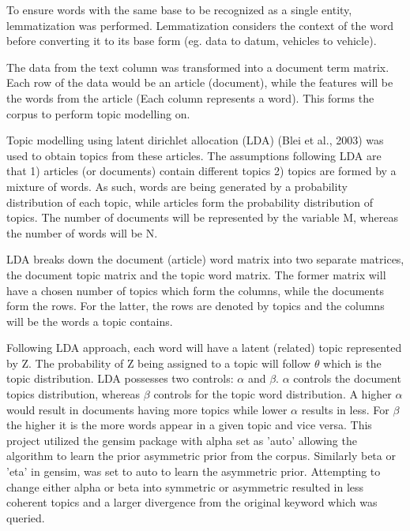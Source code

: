\documentclass{article}
\begin{document}
\begin{titlepage}
\begin{itemize}
			\quad To ensure words with the same base to be recognized as a single entity, lemmatization was performed. Lemmatization considers the context of the word before converting it to its base form (eg. data to datum, vehicles to vehicle). 
            
             \quad The data from the text column was transformed into a document term matrix. Each row of the data would be an article (document), while the features will be the words from the article (Each column represents a word). This forms the corpus to perform topic modelling on.
            
            \quad Topic modelling using latent dirichlet allocation (LDA) (Blei et al., 2003) was used to obtain topics from these articles. The assumptions following LDA are that 1) articles (or documents) contain different topics 2) topics are formed by a mixture of words. As such, words are being generated by a probability distribution of each topic, while articles form the probability distribution of topics. The number of documents will be represented by the variable M, whereas the number of words will be N.
            
           	\quad LDA breaks down the document (article) word matrix into two separate matrices, the document topic matrix and the topic word matrix. The former matrix will have a chosen number of topics which form the columns, while the documents form the rows. For the latter, the rows are denoted by topics and the columns will be the words a topic contains.
            
            \quad Following LDA approach, each word will have a latent (related) topic represented by Z. The probability of Z being assigned to a topic will follow $\theta$ which is the topic distribution. LDA possesses two controls: $\alpha$ and $\beta$. $\alpha$ controls the document topics distribution, whereas $\beta$ controls for the topic word distribution. A higher $\alpha$ would result in documents having more topics while lower $\alpha$ results in less. For $\beta$ the higher it is the more words appear in a given topic and vice versa. This project utilized the gensim package with alpha set as 'auto' allowing the algorithm to learn the prior asymmetric prior from the corpus. Similarly beta or 'eta' in gensim, was set to auto to learn the asymmetric prior. Attempting to change either alpha or beta into symmetric or asymmetric resulted in less coherent topics and a larger divergence from the original keyword which was queried.
            

\end{itemize}
\end{titlepage}
\end{document}
